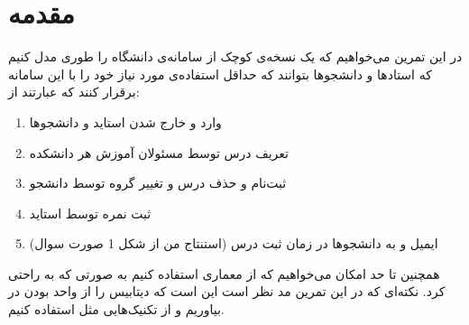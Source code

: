 \section{مقدمه}
در این تمرین می‌خواهیم که یک نسخه‌ی کوچک از سامانه‌ی
دانشگاه را طوری مدل کنیم که استاد‌ها و دانشجو‌ها بتوانند که حداقل استفاده‌ی مورد نیاز خود را با این سامانه برقرار کنند که عبارتند از:
\begin{enumerate}
    \item وارد و خارج شدن استاید و دانشجو‌ها
    \item تعریف درس توسط مسئولان آموزش هر دانشکده
    \item ثبت‌نام و حذف درس و تغییر گروه توسط دانشجو
    \item ثبت نمره توسط استاید
    \item ایمیل و  به دانشجو‌ها در زمان ثبت درس (استنتاج من از شکل 1 صورت سوال)
\end{enumerate}
همچنین تا حد امکان می‌خواهیم که از معماری
استفاده کنیم به صورتی که به راحتی
کرد. نکته‌ای که در این تمرین مد نظر است این است که دیتابیس را از واحد بودن در بیاوریم و از تکنیک‌هایی مثل
استفاده کنیم.